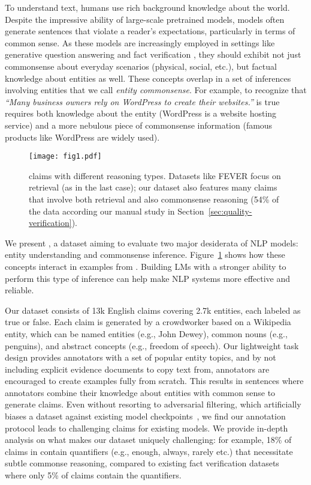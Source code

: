 To understand text, humans use rich background knowledge about the world. Despite the impressive ability of large-scale pretrained models, models often generate sentences that violate a reader's expectations, particularly in terms of common sense.  
As these models are increasingly employed in settings like generative question answering \citep{Angela_Fan_2019,Patrick_Lewis_2020} and fact verification \citep{Andreas_Vlachos_2014, William_Wang_2017, fever}, they should exhibit not just commonsense about everyday scenarios (physical, social, etc.), but factual knowledge about entities as well. These concepts overlap in a set of inferences involving entities that we call \emph{entity commonsense}. For example, to recognize that \emph{``Many business owners rely on WordPress to create their websites.''} is true requires both knowledge about the entity  (WordPress is a website hosting service) and a more nebulous piece of commonsense information (famous products like WordPress are widely used).
\begin{figure}
    \centering
    \begin{minipage}{\textwidth}
        \centering
        \texttt{[image: fig1.pdf]}
        \caption{\ours claims with different reasoning types. Datasets like FEVER focus on retrieval (as in the last case); our dataset also features many claims that involve both retrieval and also commonsense reasoning (54\% of the data according  our manual study in Section~\ref{sec:quality-verification}).}
        \label{fig:intro}
    \end{minipage}
    \vspace{-4pt}
\end{figure}

We present \oursno, a dataset aiming to evaluate two major desiderata of NLP models: entity understanding and commonsense inference. Figure~\ref{fig:intro} shows how these concepts interact in examples from \oursno. Building LMs with a stronger ability to perform this type of inference can help make NLP systems more effective and reliable.

Our dataset consists of 13k English claims covering 2.7k entities, each labeled as true or false. Each claim is generated by a crowdworker based on a Wikipedia entity, which can be named entities (e.g., John Dewey), common nouns (e.g., penguins), and abstract concepts (e.g., freedom of speech). Our lightweight task design provides annotators with a set of popular entity topics, and by not including explicit evidence documents to copy text from, annotators are encouraged to create examples fully from scratch. This results in sentences where annotators combine their knowledge about entities with common sense to generate claims. Even without resorting to adversarial filtering, which artificially biases a dataset against existing model checkpoints~\citep{Sam_Bowman_2021}, we find our annotation protocol leads to challenging claims for existing models. We provide in-depth analysis on what makes our dataset uniquely challenging: for example, 18\% of claims in \ours contain quantifiers (e.g., enough, always, rarely etc.) that necessitate subtle commonse reasoning, compared to existing fact verification datasets~\citep{fever} where only 5\% of claims contain the quantifiers.

